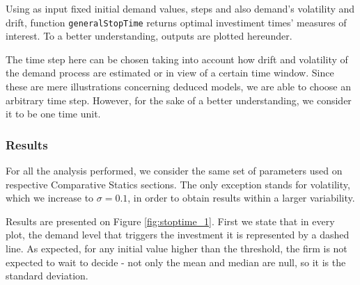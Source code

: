 


Using as input fixed initial demand values, steps and also demand's volatility and drift, function \texttt{generalStopTime} returns optimal investiment times' measures of interest. To a better understanding, outputs are plotted hereunder.


The time step here can be chosen taking into account how drift and volatility of the demand process are estimated or in view of a certain time window.
Since these are mere illustrations concerning deduced models, we are able to choose an arbitrary time step. However, for the sake of a better understanding, we consider it to be one time unit.





\subsubsection{Results}


For all the analysis performed, we consider the same set of parameters used on respective Comparative Statics sections. The only exception stands for volatility, which we increase to $\sigma=0.1$, in order to obtain results within a larger variability.



Results are presented on Figure \eqref{fig:stoptime_1}.
First we state that in every plot, the demand level that triggers the investment it is represented by a dashed line. As expected, for any initial value higher than the threshold,
the firm is not expected to wait to decide
- not only the mean and median are null, so it is the standard deviation.


